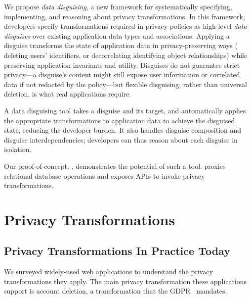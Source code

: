 %
We propose \emph{data disguising}, a new framework
for systematically specifying, implementing, and reasoning about  privacy transformations.
%
In this framework, developers specify transformations required in privacy policies as
high-level \emph{data disguises} over existing application data types and associations.
%
Applying a disguise transforms the state of application data in privacy-preserving ways (\eg
deleting users' identifiers, or decorrelating identifying object relationships) while preserving
application invariants and utility.
%
Disguises do not guarantee strict privacy---a disguise's content might still expose user
information or correlated data if not redacted by the policy---but flexible disguising,
rather than universal deletion, is what real applications require.
%

A data disguising tool takes a disguise and its target, and automatically applies the appropriate
transformations to application data to achieve the disguised state, reducing the developer burden.
%
It also handles disguise composition and disguise interdependencies; developers can
thus reason about each disguise in isolation.
%

Our proof-of-concept, \sys, demonstrates the potential of such a tool.
%
\sys proxies relational database operations and exposes APIs to invoke privacy transformations.
%

\section{Privacy Transformations}
\label{sec:survey}

\subsection{Privacy Transformations In Practice Today}
%
We surveyed widely-used web applications to understand the privacy
transformations they apply.
%
The main privacy transformation these applications support is account deletion,
a transformation that \eg the GDPR~\cite[Art.\ 17]{eu:gdpr} mandates.
%


